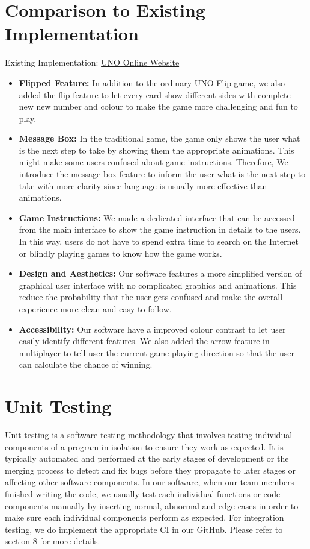 \documentclass[12pt, titlepage]{article}
\begin{document}
\section{Comparison to Existing Implementation}
Existing Implementation: \href{https://unoonline.io/}{UNO Online Website}
\begin{itemize}
    \item \textbf{Flipped Feature:}
    In addition to the ordinary UNO Flip game, we also added the flip feature to let every card show different sides with complete new new number and colour to make the game more challenging and fun to play.
    \item \textbf{Message Box:} In the traditional game, the game only shows the user what is the next step to take by showing them the appropriate animations. This might make some users confused about game instructions. Therefore, We introduce the message box feature to inform the user what is the next step to take with more clarity since language is usually more effective than animations.
    \item \textbf{Game Instructions:} We made a dedicated interface that can be accessed from the main interface to show the game instruction in details to the users. In this way, users do not have to spend extra time to search on the Internet or blindly playing games to know how the game works.
    \item \textbf{Design and Aesthetics:} Our software features a more simplified version of graphical user interface with no complicated graphics and animations. This reduce the probability that the user gets confused and make the overall experience more clean and easy to follow.
    \item \textbf{Accessibility:} Our software have a improved colour contrast to let user easily identify different features. We also added the arrow feature in multiplayer to tell user the current game playing direction so that the user can calculate the chance of winning. 
\end{itemize}

\section{Unit Testing}
Unit testing is a software testing methodology that involves testing individual components of a program in isolation to ensure they work as expected. It is typically automated and performed at the early stages of development or the merging process to detect and fix bugs before they propagate to later stages or affecting other software components. In our software, when our team members finished writing the code, we usually test each individual functions or code components manually by inserting normal, abnormal and edge cases in order to make sure each individual components perform as expected. For integration testing, we do implement the appropriate CI in our GitHub. Please refer to section 8 for more details.
\end{document}
